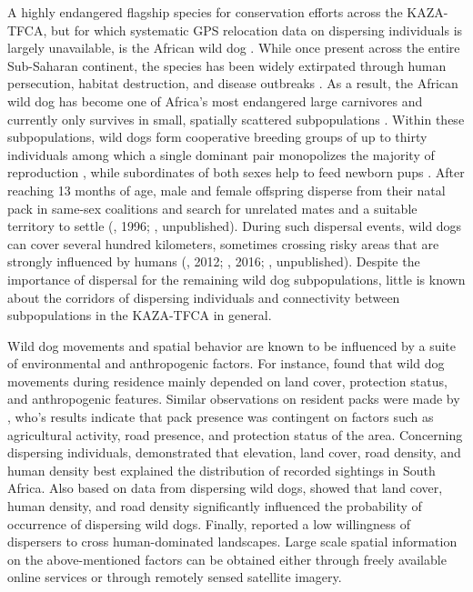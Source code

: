 \documentclass[abstract=on,10pt,a4paper,bibliography=totocnumbered]{scrartcl}
\begin{document}
A highly endangered flagship species for conservation efforts across the
KAZA-TFCA, but for which systematic GPS relocation data on dispersing
individuals is largely unavailable, is the African wild dog
\citep{VanDerMeer.2016}. While once present across the entire Sub-Saharan
continent, the species has been widely extirpated through human persecution,
habitat destruction, and disease outbreaks \citep{Woodroffe.2012}. As a result,
the African wild dog has become one of Africa's most endangered large carnivores
and currently only survives in small, spatially scattered subpopulations
\citep{Woodroffe.2012}. Within these subpopulations, wild dogs form cooperative
breeding groups of up to thirty individuals among which a single dominant pair
monopolizes the majority of reproduction \citep{Frame.1979, Fuller.1992,
Creel.2002}, while subordinates of both sexes help to feed newborn pups
\citep{Malcolm.1982}. After reaching 13 months of age, male and female offspring
disperse from their natal pack in same-sex coalitions and search for unrelated
mates and a suitable territory to settle (\citeauthor{McNutt.1996}, 1996;
\citeauthor{Behr.2019}, unpublished). During such dispersal events, wild dogs
can cover several hundred kilometers, sometimes crossing risky areas that are
strongly influenced by humans (\citeauthor{DaviesMostert.2012}, 2012;
\citeauthor{Masenga.2016}, 2016; \citeauthor{Cozzi.2020}, unpublished). Despite
the importance of dispersal for the remaining wild dog subpopulations, little is
known about the corridors of dispersing individuals and connectivity between
subpopulations in the KAZA-TFCA in general.

Wild dog movements and spatial behavior are known to be influenced by a suite of
environmental and anthropogenic factors. For instance, \cite{Abrahms.2017} found
that wild dog movements during residence mainly depended on land cover,
protection status, and anthropogenic features. Similar observations on resident
packs were made by \cite{Pretorius.2019}, who's results indicate that pack
presence was contingent on factors such as agricultural activity, road presence,
and protection status of the area. Concerning dispersing individuals,
\cite{Whittington.2011} demonstrated that elevation, land cover, road density,
and human density best explained the distribution of recorded sightings in South
Africa. Also based on data from dispersing wild dogs, \cite{Jackson.2016} showed
that land cover, human density, and road density significantly influenced the
probability of occurrence of dispersing wild dogs. Finally, \cite{Masenga.2016}
reported a low willingness of dispersers to cross human-dominated landscapes.
Large scale spatial information on the above-mentioned factors can be obtained
either through freely available online services or through remotely sensed
satellite imagery.
\end{document}
